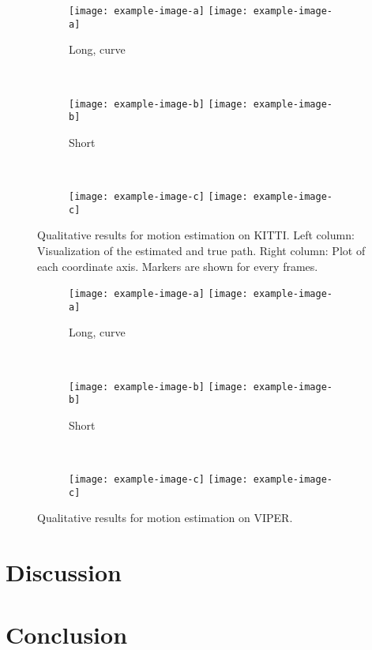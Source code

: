 			\begin{figure}
				\centering
				\begin{subfigure}[b]{\linewidth}
					\centering
					\texttt{[image: example-image-a]}
					\texttt{[image: example-image-a]}
					\caption{
						Long, curve
						\label{fig:0}
					}
				\end{subfigure}%
				\\
				\begin{subfigure}[b]{\linewidth}
					\centering
					\texttt{[image: example-image-b]}
					\texttt{[image: example-image-b]}
					\caption{
						Short
						\label{fig:0}
					}
				\end{subfigure}%
				\\
				\begin{subfigure}[b]{\linewidth}
					\centering
					\texttt{[image: example-image-c]}
					\texttt{[image: example-image-c]}
					\caption{
						\label{fig:0}
					}
				\end{subfigure}%
				\caption[Qualitative results for motion estimation on KITTI]
						{Qualitative results for motion estimation on KITTI.
						 Left column: Visualization of the estimated and true path.
						 Right column: Plot of each coordinate axis.
						 Markers are shown for every  frames.
						\label{fig:0}}
			\end{figure}
	
	
			\begin{figure}
				\centering
				\begin{subfigure}[b]{\linewidth}
					\centering
					\texttt{[image: example-image-a]}
					\texttt{[image: example-image-a]}
					\caption{
						Long, curve
						\label{fig:0}
					}
				\end{subfigure}%
				\\
				\begin{subfigure}[b]{\linewidth}
					\centering
					\texttt{[image: example-image-b]}
					\texttt{[image: example-image-b]}
					\caption{
						Short
						\label{fig:0}
					}
				\end{subfigure}%
				\\
				\begin{subfigure}[b]{\linewidth}
					\centering
					\texttt{[image: example-image-c]}
					\texttt{[image: example-image-c]}
					\caption{
						\label{fig:0}
					}
				\end{subfigure}%
				\caption[Qualitative results for motion estimation on VIPER]
						{Qualitative results for motion estimation on VIPER.
						 \label{fig:0}}
			\end{figure}
		
	\section{Discussion}
	\section{Conclusion}
